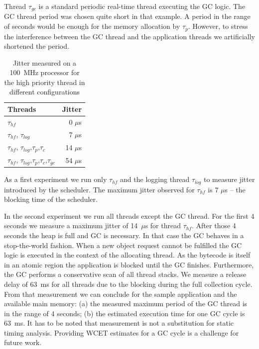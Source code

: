 Thread $\tau_{gc}$ is a standard periodic real-time thread executing
the GC logic. The GC thread period was chosen quite short in that
example. A period in the range of seconds would be enough for the
memory allocation by $\tau_{p}$. However, to stress the interference
between the GC thread and the application threads we artificially
shortened the period.

\begin{table}
    \centering
    \begin{tabular}{lr}
    \toprule
    Threads & Jitter \\
    \midrule
    $\tau_{hf}$ & 0 $\mu$s \\
    $\tau_{hf}$, $\tau_{log}$ & 7 $\mu$s \\
    $\tau_{hf}$, $\tau_{log}$,$\tau_{p}$,$\tau_{c}$ & 14 $\mu$s \\
    $\tau_{hf}$, $\tau_{log}$,$\tau_{p}$,$\tau_{c}$,$\tau_{gc}$ & 54 $\mu$s \\
    \bottomrule
    \end{tabular}
    \caption{Jitter measured on a 100~MHz processor for the high priority thread in different configurations}
    \label{tab:jitter}
\end{table}
As a first experiment we run only $\tau_{hf}$ and the logging thread
$\tau_{log}$ to measure jitter introduced by the scheduler. The
maximum jitter observed for $\tau_{hf}$ is 7 $\mu$s -- the blocking
time of the scheduler.

In the second experiment we run all threads except the GC thread.
For the first 4 seconds we measure a maximum jitter of 14~$\mu$s for
thread $\tau_{hf}$. After those 4 seconds the heap is full and GC is
necessary. In that case the GC behaves in a stop-the-world fashion.
When a new object request cannot be fulfilled the GC logic is
executed in the context of the allocating thread. As the bytecode
 is itself in an atomic region the application is blocked
until the GC finishes. Furthermore, the GC performs a conservative
scan of all thread stacks. We measure a release delay of 63~ms for
all threads due to the blocking during the full collection cycle.
From that measurement we can conclude for the sample application and
the available main memory: (a) the measured maximum period of the GC
thread is in the range of 4 seconds; (b) the estimated execution
time for one GC cycle is 63~ms. It has to be noted that measurement
is not a substitution for static timing analysis. Providing WCET
estimates for a GC cycle is a challenge for future work.

